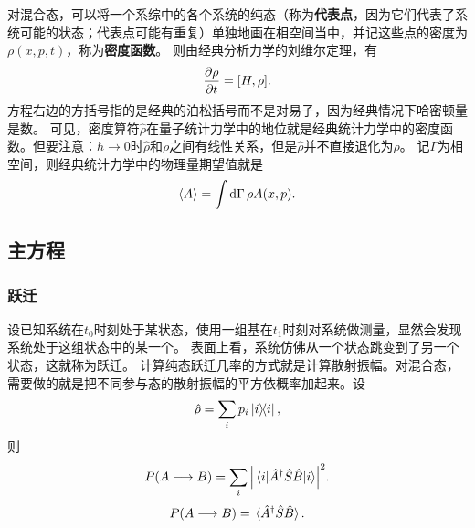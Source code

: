 \documentclass[hyperref, UTF8, a4paper]{ctexart}
\begin{document}
对混合态，可以将一个系综中的各个系统的纯态（称为\textbf{代表点}，因为它们代表了系统可能的状态；代表点可能有重复）单独地画在相空间当中，并记这些点的密度为$\rho(x, p, t)$，称为\textbf{密度函数}。
则由经典分析力学的刘维尔定理，有
\begin{equation}
    \pdv{\rho}{t} = [H, \rho].
\end{equation}
方程右边的方括号指的是经典的泊松括号而不是对易子，因为经典情况下哈密顿量是数。
可见，密度算符$\hat{\rho}$在量子统计力学中的地位就是经典统计力学中的密度函数。但要注意：$\hbar\to 0$时$\hat{\rho}$和$\rho$之间有线性关系，但是$\hat{\rho}$并不直接退化为$\rho$。
记$\Gamma$为相空间，则经典统计力学中的物理量期望值就是
\begin{equation}
    \expval{A} = \int \dd{\Gamma} \rho A(x, p).
\end{equation}

\subsection{主方程}



\subsubsection{跃迁}

设已知系统在$t_0$时刻处于某状态，使用一组基在$t_1$时刻对系统做测量，显然会发现系统处于这组状态中的某一个。
表面上看，系统仿佛从一个状态跳变到了另一个状态，这就称为跃迁。
计算纯态跃迁几率的方式就是计算散射振幅。对混合态，需要做的就是把不同参与态的散射振幅的平方依概率加起来。设
\[
    \hat{\rho} = \sum_i p_i \dyad{i},
\]
则
\[
    P(A \longrightarrow B) = \sum_i \abs{\mel{i}{\hat{A}^\dagger \hat{S} \hat{B}}{i}}^2.
\]
\begin{equation}
    P(A \longrightarrow B) = \expval*{\hat{A}^\dagger \hat{S} \hat{B}}.
\end{equation}
\end{document}

